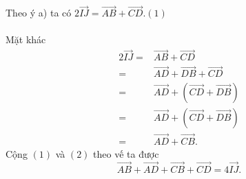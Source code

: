 \begin{bt}
{\begin{listEX}
			\item Theo ý a) ta có $2\overrightarrow{IJ} = \overrightarrow{AB} + \overrightarrow{CD}$.\hfill$(1)$\\\\
			Mặt khác 
			{\allowdisplaybreaks
				\begin{align*}
					2\overrightarrow{IJ} =& \overrightarrow{AB} + \overrightarrow{CD}\\
					=&\overrightarrow{AD} + \overrightarrow{DB} + \overrightarrow{CD}\\
					=&\overrightarrow{AD} + (\overrightarrow{CD} + \overrightarrow{DB})\\
					=&\overrightarrow{AD} + (\overrightarrow{CD} + \overrightarrow{DB})\\
					=&\overrightarrow{AD} + \overrightarrow{CB}.\tag{2}
			\end{align*}}
			Cộng $(1)$ và $(2)$ theo vế ta được
			\[\overrightarrow{AB} + \overrightarrow{AD} + \overrightarrow{CB} + \overrightarrow{CD}= 4\overrightarrow{IJ}.\]
		\end{listEX}
	}
\end{bt}

